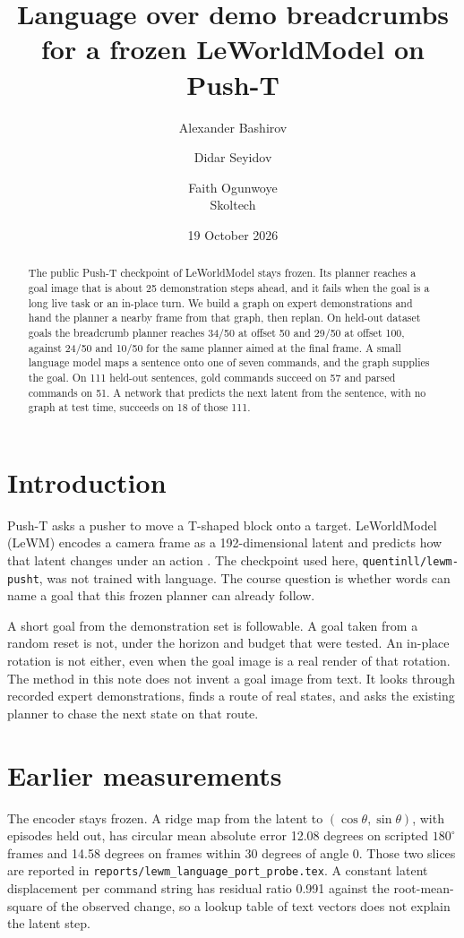 \documentclass[11pt,a4paper]{article}
\title{Language over demo breadcrumbs\\for a frozen LeWorldModel on Push-T}
\author{Alexander Bashirov \and Didar Seyidov \and Faith Ogunwoye\\Skoltech}
\date{19 October 2026}
\begin{document}
\maketitle

\begin{abstract}
The public Push-T checkpoint of LeWorldModel stays frozen.
Its planner reaches a goal image that is about 25 demonstration steps ahead, and it fails when the goal is a long live task or an in-place turn.
We build a graph on expert demonstrations and hand the planner a nearby frame from that graph, then replan.
On held-out dataset goals the breadcrumb planner reaches 34/50 at offset 50 and 29/50 at offset 100, against 24/50 and 10/50 for the same planner aimed at the final frame.
A small language model maps a sentence onto one of seven commands, and the graph supplies the goal.
On 111 held-out sentences, gold commands succeed on 57 and parsed commands on 51.
A network that predicts the next latent from the sentence, with no graph at test time, succeeds on 18 of those 111.
\end{abstract}

\section{Introduction}
Push-T asks a pusher to move a T-shaped block onto a target.
LeWorldModel (LeWM) encodes a camera frame as a 192-dimensional latent and predicts how that latent changes under an action \citep{maes2026lewm}.
The checkpoint used here, \texttt{quentinll/lewm-pusht}, was not trained with language.
The course question is whether words can name a goal that this frozen planner can already follow.

A short goal from the demonstration set is followable.
A goal taken from a random reset is not, under the horizon and budget that were tested.
An in-place rotation is not either, even when the goal image is a real render of that rotation.
The method in this note does not invent a goal image from text.
It looks through recorded expert demonstrations, finds a route of real states, and asks the existing planner to chase the next state on that route.

\section{Earlier measurements}
The encoder stays frozen.
A ridge map from the latent to $(\cos\theta,\sin\theta)$, with episodes held out, has circular mean absolute error 12.08 degrees on scripted $180^{\circ}$ frames and 14.58 degrees on frames within 30 degrees of angle 0.
Those two slices are reported in \texttt{reports/lewm\_language\_port\_probe.tex}.
A constant latent displacement per command string has residual ratio 0.991 against the root-mean-square of the observed change, so a lookup table of text vectors does not explain the latent step.
\end{document}
